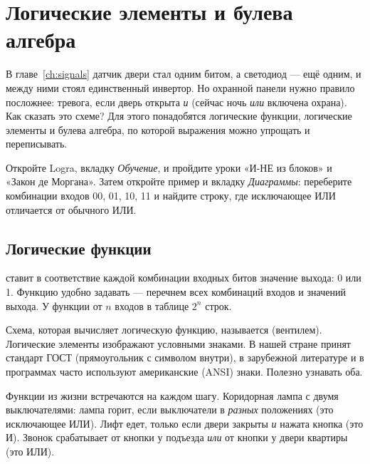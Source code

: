 \chapter{Логические элементы и булева алгебра}
\label{ch:gates}

В главе~\ref{ch:signals} датчик двери стал одним битом, а светодиод ---
ещё одним, и между ними стоял единственный инвертор. Но охранной панели нужно
правило посложнее: тревога, если дверь открыта \emph{и} (сейчас ночь \emph{или}
включена охрана). Как сказать это схеме? Для этого понадобятся логические
функции, логические элементы и булева алгебра, по которой выражения можно
упрощать и переписывать.

\begin{buildbox}
Откройте Logra, вкладку \emph{Обучение}, и пройдите уроки «И-НЕ из блоков» и
«Закон де Моргана». Затем откройте пример  и вкладку
\emph{Диаграммы}: переберите комбинации входов 00, 01, 10, 11 и найдите
строку, где исключающее ИЛИ отличается от обычного ИЛИ.
\end{buildbox}

\section{Логические функции}

 ставит в соответствие каждой комбинации входных
битов значение выхода: 0 или 1. Функцию удобно задавать  --- перечнем всех комбинаций входов и значений выхода. У функции от
$n$ входов в таблице $2^n$ строк.

Схема, которая вычисляет логическую функцию, называется
 (вентилем). Логические элементы изображают
условными знаками. В нашей стране принят стандарт ГОСТ (прямоугольник с
символом внутри), в зарубежной литературе и в программах часто используют
американские (ANSI) знаки. Полезно узнавать оба.

Функции из жизни встречаются на каждом шагу. Коридорная лампа с двумя
выключателями: лампа горит, если выключатели в \emph{разных} положениях
(это исключающее ИЛИ). Лифт едет, только если двери закрыты \emph{и} нажата
кнопка (это И). Звонок срабатывает от кнопки у подъезда \emph{или} от кнопки
у двери квартиры (это ИЛИ).

